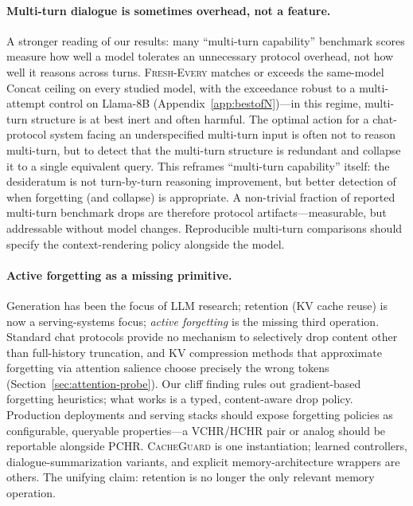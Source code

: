 \documentclass{article}
\begin{document}
\paragraph{Multi-turn dialogue is sometimes overhead, not a feature.}
A stronger reading of our results: many ``multi-turn capability'' benchmark scores measure how well a model tolerates an unnecessary protocol overhead, not how well it reasons across turns. \textsc{Fresh-Every} matches or exceeds the same-model Concat ceiling on every studied model, with the exceedance robust to a multi-attempt control on Llama-8B (Appendix~\ref{app:bestofN})---in this regime, multi-turn structure is at best inert and often harmful. The optimal action for a chat-protocol system facing an underspecified multi-turn input is often not to reason multi-turn, but to detect that the multi-turn structure is redundant and collapse it to a single equivalent query. This reframes ``multi-turn capability'' itself: the desideratum is not turn-by-turn reasoning improvement, but better detection of when forgetting (and collapse) is appropriate. A non-trivial fraction of reported multi-turn benchmark drops are therefore protocol artifacts---measurable, but addressable without model changes. Reproducible multi-turn comparisons should specify the context-rendering policy alongside the model.

\paragraph{Active forgetting as a missing primitive.}
Generation has been the focus of LLM research; retention (KV cache reuse) is now a serving-systems focus; \emph{active forgetting} is the missing third operation. Standard chat protocols provide no mechanism to selectively drop content other than full-history truncation, and KV compression methods that approximate forgetting via attention salience choose precisely the wrong tokens (Section~\ref{sec:attention-probe}). Our cliff finding rules out gradient-based forgetting heuristics; what works is a typed, content-aware drop policy. Production deployments and serving stacks should expose forgetting policies as configurable, queryable properties---a VCHR/HCHR pair or analog should be reportable alongside PCHR. \textsc{CacheGuard} is one instantiation; learned controllers, dialogue-summarization variants, and explicit memory-architecture wrappers are others. The unifying claim: retention is no longer the only relevant memory operation.
\end{document}
